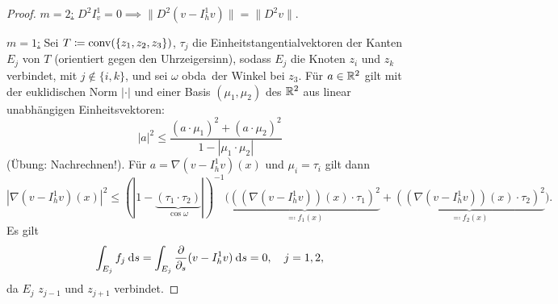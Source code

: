\documentclass[../skript.tex]{subfiles}
\begin{document}
\begin{proof}
	\underline{$m=2$:} $D^2 I^1_v = 0 \implies \| D^2(v-I_h^1 v)\| = \|D^2 v\|$.

	\underline{$m=1$:} Sei $T \coloneqq \operatorname{conv}(\{z_1,z_2,z_3\})$, $\tau_j$ die Einheitstangentialvektoren der Kanten $E_j$ von $T$ (orientiert gegen den Uhrzeigersinn), sodass $E_j$ die Knoten $z_i$ und $z_k$ verbindet, mit $j\not\in\{i,k\}$, und sei $\omega$ \ac{obda}\ der Winkel bei $z_3$. Für $a\in\mathbb{R}^2$ gilt mit der euklidischen Norm $|\cdot|$ und einer Basis $(\mu_1,\mu_2)$ des $\mathbb{R}^2$ aus linear unabhängigen Einheitsvektoren:
	\[
		| a|^2 \leq \frac{(a\cdot\mu_1)^2 + (a\cdot\mu_2)^2}{1- |\mu_1\cdot\mu_2|}
	\]
	(Übung: Nachrechnen!). 
	Für $a = \nabla(v-I_h^1 v)(x)$ und $\mu_i = \tau_i$ gilt dann
	\[
		|\nabla(v-I_h^1 v)(x)|^2\leq (| 1-\underbrace{(\tau_1\cdot\tau_2)}_{\cos{\omega}}| )^{-1}\big( \underbrace{((\nabla(v-I_h^1 v))(x)\cdot\tau_1 )^2}_{\eqqcolon f_1(x)} + \underbrace{( (\nabla(v-I_h^1 v))(x)\cdot\tau_2 )^2}_{\eqqcolon f_2(x)} \big).
	\] 
	Es gilt
	\[
		\int_{E_j} f_j \:\mathrm{d}s = \int_{E_j}\frac{\partial}{\partial_s}(v-I_h^1 v) \:\mathrm{d}s = 0,\quad j=1,2,
	\]
	da $E_j$ $z_{j-1}$ und $z_{j+1}$ verbindet.


\end{proof}
\end{document}
